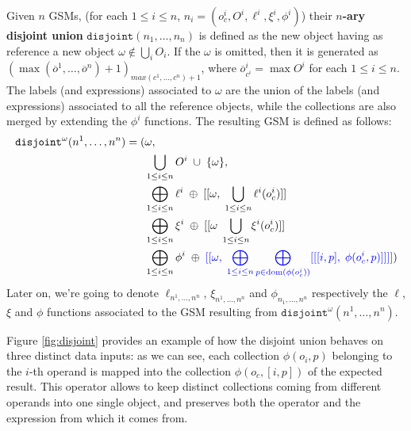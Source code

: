 \begin{definition}\label{gsql:disjoint}
	Given $n$ GSMs, (for each $1\leq i\leq n$, $n_i=(o_c^i,O^i,\ell^i,\xi^i,\phi^i)$) their \textbf{$n$-ary disjoint union}  $\texttt{disjoint}(n_1,\dots,n_n)$ is defined as the new object having as reference a new object $\omega\notin \bigcup_i O_i$. If the $\omega$ is omitted, then it is generated as  $(\max(\overline{o}^1,\dots,\overline{o}^n)+1)_{max(c^1,\dots,c^n)+1}$, where $\overline{o}^i_{c^i}=\max O^i$ for each $1\leq i\leq n$.
	 The labels (and expressions) associated to $\omega$ are the union of the labels (and expressions) associated to all the reference objects, while the collections are also merged by extending the $\phi^i$  functions.%
%
	The resulting GSM is defined as follows:
	\begin{alignat*}{2}
	\texttt{disjoint}^\omega(n^1,\dots,n^n)=(&\omega,\\
	&\bigcup_{1\leq i\leq n}O^i\;\cup\;\{\omega\},\\
	&\bigoplus_{1\leq i\leq n}\ell^i\;\oplus\;[[\omega,\; \bigcup_{1\leq i\leq n}\ell^i(o_c^i)]]\\
	&\bigoplus_{1\leq i\leq n}\xi^i\;\oplus\;[[\omega\; \bigcup_{1\leq i\leq n}\xi^i(o_c^i)]]\\
	&\bigoplus_{1\leq i\leq n}\phi^i\;\oplus\; {\color{blue}[[\omega,\; \bigoplus_{1\leq i\leq n}\bigoplus_{p\in\operatorname{dom}(\phi(o^i_c))}[[[i,p],\; \phi(o^i_c,p)]]]]})\\
	\end{alignat*}
Later on, we're going to denote $\ell_{n^1,\dots,n^n}$, $\xi_{n^1,\dots,n^n}$ and $\phi_{n_1,\dots,n^n}$ respectively the $\ell$, $\xi$ and $\phi$ functions associated to the GSM resulting from $\texttt{disjoint}^\omega(n^1,\dots,n^n)$.
\end{definition}



\begin{example}
	Figure \vref{fig:disjoint} provides an example of how the disjoint union behaves on three distinct data inputs: as we can see, each collection $\phi(o_i,p)$ belonging to the $i$-th operand is mapped into the collection $\phi(o_c,[i,p])$ of the expected result. This operator allows to keep distinct collections coming from different operands into one single object, and preserves both the operator and the expression from which it comes from.
\end{example}

